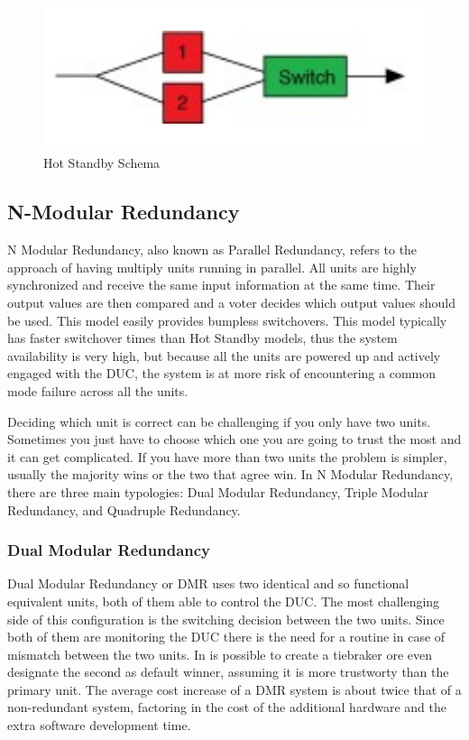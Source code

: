 \documentclass[./dissertation.tex]{subfiles}
\begin{document}
\begin{figure}[h!]
\centering
  \includegraphics[scale = 0.50]{imgs/hotred.png}
  \caption{Hot Standby Schema}
  \label{fig:hotred}
\end{figure}
\subsection{N-Modular Redundancy}
N Modular Redundancy, also known as Parallel Redundancy, refers to the approach of having multiply units running in parallel. All units are highly synchronized and receive the same input information at the same time. Their output values are then compared and a voter decides which output values should be used. This model easily provides bumpless switchovers.
This model typically has faster switchover times than Hot Standby models, thus the system availability is very high, but because all the units are powered up and actively engaged with the DUC, the system is at more risk of encountering a common mode failure across all the units.

Deciding which unit is correct can be challenging if you only have two units. Sometimes you just have to choose which one you are going to trust the most and it can get complicated. If you have more than two units the problem is simpler, usually the majority wins or the two that agree win. In N Modular Redundancy, there are three main typologies: Dual Modular Redundancy, Triple Modular Redundancy, and Quadruple Redundancy.


\subsubsection{Dual Modular Redundancy}
Dual Modular Redundancy or DMR uses two identical and so functional equivalent units, both of them able to control the DUC. The most challenging side of this configuration is the switching decision between the two units. Since both of them are monitoring the DUC there is the need for a routine in case of mismatch between the two units. In is possible to create a tiebraker ore even designate the second as default winner, assuming it is more trustworty than the primary unit. 
The average cost increase of a DMR system is about twice that of a non-redundant system, factoring in the cost of the additional hardware and the extra software development time.
\end{document}

